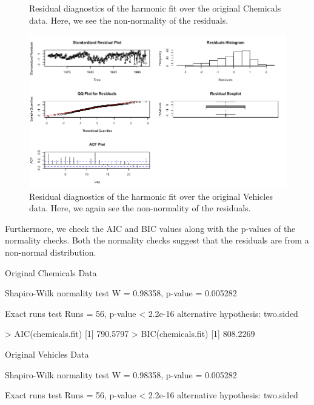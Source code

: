 \begin{enumerate}[label=(\roman*)]
\begin{figure}[!htb]
    \caption[Residual diagnostics of the harmonic fit over the original Chemicals data.]{Residual diagnostics of the harmonic fit over the original Chemicals data. Here, we see the non-normality of the residuals.}
    \label{fig:res_chem_har}
\end{figure}
\begin{figure}[!htb]
    \centering
    \includegraphics[width=\linewidth]{Images/P3/LFit_Res_Veh.png}
    \caption[Residual diagnostics of the harmonic fit over the original Vehicles data.]{Residual diagnostics of the harmonic fit over the original Vehicles data. Here, we again see the non-normality of the residuals.}
    \label{fig:res_veh_har}
\end{figure}
Furthermore, we check the AIC and BIC values along with the p-values of the normality checks. Both the normality checks suggest that the residuals are from a non-normal distribution. 
\small\begin{block}
Original Chemicals Data

Shapiro-Wilk normality test
W = 0.98358, p-value = 0.005282

Exact runs test
Runs = 56, p-value < 2.2e-16
alternative hypothesis: two.sided

> AIC(chemicals.fit)
[1] 790.5797
> BIC(chemicals.fit)
[1] 808.2269

Original Vehicles Data

Shapiro-Wilk normality test
W = 0.98358, p-value = 0.005282

Exact runs test
Runs = 56, p-value < 2.2e-16
alternative hypothesis: two.sided


\end{block}
\end{enumerate}
